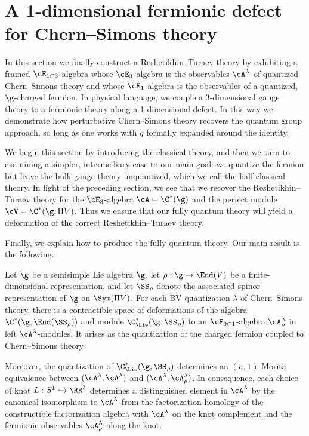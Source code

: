 \documentclass[10pt]{amsart}
\begin{document}
\section{A 1-dimensional fermionic defect for Chern--Simons theory}
\label{sec: coupled}

In this section we finally construct a Reshetikhin--Turaev theory 
by exhibiting a framed $\cE_{1 \subset 3}$-algebra 
whose $\cE_3$-algebra is the observables $\cA^\lambda$ of quantized Chern--Simons theory
and whose $\cE_1$-algebra is the observables of a quantized, $\g$-charged fermion.
In physical language, we couple a 3-dimensional gauge theory to a fermionic theory along a 1-dimensional defect.
In this way we demonstrate how perturbative Chern--Simons theory recovers the quantum group approach, so long as one works with $q$ formally expanded around the identity.

We begin this section by introducing the classical theory,
and then we turn to examining a simpler, intermediary case to our main goal:
we quantize the fermion but leave the bulk gauge theory unquantized,
which we call the half-classical theory.
In light of the preceding section, 
we see that we recover the Reshetikhin--Turaev theory for the $\cE_3$-algebra $\cA = \C^*(\g)$ and the perfect module $\cV = \C^*(\g, \Pi V)$.
Thus we ensure that our fully quantum theory will yield a deformation of the correct Reshetikhin--Turaev theory.

Finally, we explain how to produce the fully quantum theory.
Our main result is the following.

\begin{prp} 
\label{prp: defect main}
Let $\g$ be a semisimple Lie algebra $\g$, 
let $\rho: \g \to \End(V)$ be a finite-dimensional representation,
and let $\SS_\rho$ denote the associated spinor representation of $\g$ on $\Sym(\Pi V)$.
For each BV quantization $\lambda$ of Chern--Simons theory,
there is a contractible space of deformations of the algebra $\C^*(\g,\End(\SS_\rho))$ and module $\C^*_{\Lie}(\g, \SS_\rho)$ to an $\cE_{0 \subset 1}$-algebra $\cA^\lambda_\rho$ in left $\cA^\lambda$-modules.
It arises as the quantization of the charged fermion coupled to Chern--Simons theory.

Moreover, the quantization of $\C^*_{\Lie}(\g, \SS_\rho)$ determines an $(n,1)$-Morita equivalence between $(\cA^\lambda, \cA^\lambda)$ and $(\cA^\lambda, \cA^\lambda_\rho)$.
In consequence, each choice of knot $L : S^1 \hookrightarrow \RR^3$ determines a distinguished element in $\cA^\lambda$ by the canonical isomorphism to $\cA^\lambda$ from the factorization homology of the constructible factorization algebra with $\cA^\lambda$ on the knot complement and the fermionic observables $\cA^\lambda_\rho$ along the knot.
\end{prp}
\end{document}
